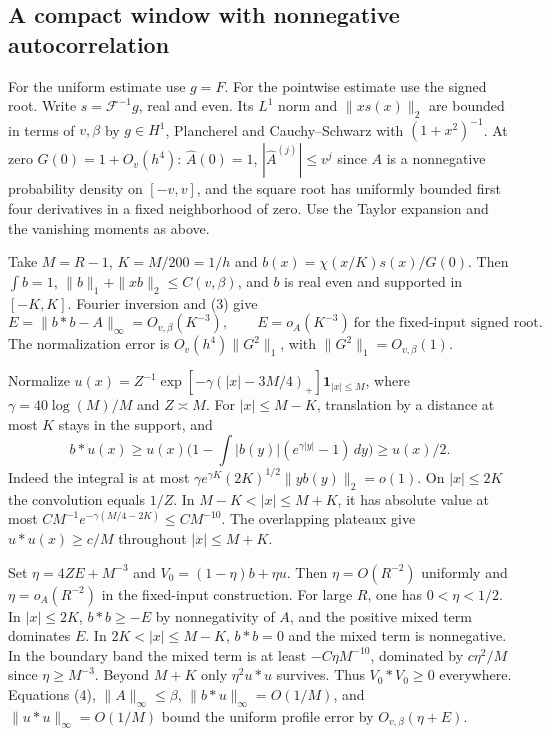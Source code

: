 \documentclass[11pt]{article}
\begin{document}
\subsection{A compact window with nonnegative autocorrelation}

For the uniform estimate use \(g=F\). For the pointwise estimate use the signed root. Write \(s=\mathcal F^{-1}g\), real and even. Its \(L^1\) norm and \(\|x s(x)\|_2\) are bounded in terms of \(v,\beta\) by \(g\in H^1\), Plancherel and Cauchy--Schwarz with \((1+x^2)^{-1}\). At zero \(G(0)=1+O_v(h^4)\): \(\widehat A(0)=1\), \(|\widehat A^{(j)}|\le v^j\) since \(A\) is a nonnegative probability density on \([-v,v]\), and the square root has uniformly bounded first four derivatives in a fixed neighborhood of zero. Use the Taylor expansion and the vanishing moments as above.

Take \(M=R-1\), \(K=M/200=1/h\) and \(b(x)=\chi(x/K)s(x)/G(0)\). Then \(\int b=1\), \(\|b\|_1+\|xb\|_2\le C(v,\beta)\), and \(b\) is real even and supported in \([-K,K]\). Fourier inversion and (3) give
\[
 E=\|b*b-A\|_\infty=O_{v,\beta}(K^{-3}),\qquad
 E=o_A(K^{-3})\ \text{for the fixed-input signed root}.            \tag{4}
\]
The normalization error is \(O_v(h^4)\|G^2\|_1\), with \(\|G^2\|_1=O_{v,\beta}(1)\).

Normalize \(u(x)=Z^{-1}\exp[-\gamma(|x|-3M/4)_+]\mathbf1_{|x|\le M}\), where \(\gamma=40\log(M)/M\) and \(Z\asymp M\). For \(|x|\le M-K\), translation by a distance at most \(K\) stays in the support, and
\[
   b*u(x)\ge u(x)\Big(1-\int |b(y)|(e^{\gamma |y|}-1)\,dy\Big)\ge u(x)/2.
\]
Indeed the integral is at most \(\gamma e^{\gamma K}(2K)^{1/2}\|yb(y)\|_2=o(1)\). On \(|x|\le2K\) the convolution equals \(1/Z\). In \(M-K<|x|\le M+K\), it has absolute value at most \(C M^{-1}e^{-\gamma(M/4-2K)}\le C M^{-10}\). The overlapping plateaux give \(u*u(x)\ge c/M\) throughout \(|x|\le M+K\).

Set \(\eta=4ZE+M^{-3}\) and \(V_0=(1-\eta)b+\eta u\). Then \(\eta=O(R^{-2})\) uniformly and \(\eta=o_A(R^{-2})\) in the fixed-input construction. For large \(R\), one has \(0<\eta<1/2\). In \(|x|\le2K\), \(b*b\ge-E\) by nonnegativity of \(A\), and the positive mixed term dominates \(E\). In \(2K<|x|\le M-K\), \(b*b=0\) and the mixed term is nonnegative. In the boundary band the mixed term is at least \(-C\eta M^{-10}\), dominated by \(c\eta^2/M\) since \(\eta\ge M^{-3}\). Beyond \(M+K\) only \(\eta^2 u*u\) survives. Thus \(V_0*V_0\ge0\) everywhere. Equations (4), \(\|A\|_\infty\le\beta\), \(\|b*u\|_\infty=O(1/M)\), and \(\|u*u\|_\infty=O(1/M)\) bound the uniform profile error by \(O_{v,\beta}(\eta+E)\).
\end{document}

